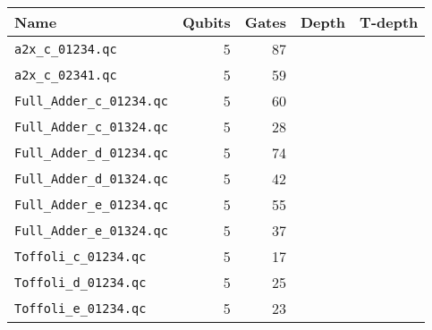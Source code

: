 \documentclass{article}
\begin{document}
  \vspace{5mm}
  \begin{tabular}{|l|r|r|r|r|}
   \hline
   Name & Qubits & Gates & Depth & T-depth  \\ \hline  \hline
   {\tt a2x\_c\_01234.qc} & 5 & 87 &  &  \\  \hline
   {\tt a2x\_c\_02341.qc} & 5 & 59 &  &  \\  \hline
   {\tt Full\_Adder\_c\_01234.qc} & 5 & 60 &  &    \\  \hline
   {\tt Full\_Adder\_c\_01324.qc} & 5 & 28 &  &    \\  \hline
  {\tt Full\_Adder\_d\_01234.qc} & 5 & 74 &  &    \\  \hline
   {\tt Full\_Adder\_d\_01324.qc} & 5 & 42 &  &    \\  \hline
     {\tt Full\_Adder\_e\_01234.qc} & 5 & 55 &  &    \\  \hline
   {\tt Full\_Adder\_e\_01324.qc} & 5 & 37 &  &    \\  \hline
    {\tt Toffoli\_c\_01234.qc} & 5 & 17 &  &   \\  \hline
   {\tt Toffoli\_d\_01234.qc} & 5 & 25 &  &  \\  \hline
   {\tt Toffoli\_e\_01234.qc} & 5 & 23 &  &   \\  \hline

  \end{tabular} 
  \vspace{5mm}



 
\end{document}
